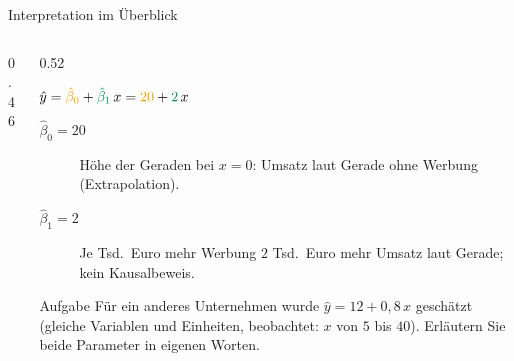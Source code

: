 \documentclass[aspectratio=169,11pt]{beamer}
\newcommand{\uebpunkte}{\addplot[only marks, mark=*, mark size=2.6pt, color=hsbiblue]
  coordinates {(1,21) (2,26) (3,24) (4,30) (5,29)};}
\begin{document}
\begin{frame}{Interpretation im Überblick}
  \begin{columns}[T]
    \begin{column}{0.46\textwidth}
    \end{column}
    \begin{column}{0.52\textwidth}
      \small
      \begin{block}{$\hat{y} = {\color{hsbiaccent}\hat{\beta}_0} + {\color{hsbigreen}\hat{\beta}_1}\,x = {\color{hsbiaccent}20} + {\color{hsbigreen}2}\,x$}
        \begin{description}
          \item[{\color{hsbiaccent}$\hat{\beta}_0 = 20$}] Höhe der Geraden bei $x = 0$:
                Umsatz laut Gerade ohne Werbung (Extrapolation).
          \item[{\color{hsbigreen}$\hat{\beta}_1 = 2$}] Je Tsd.\ Euro mehr Werbung
                $2$ Tsd.\ Euro mehr Umsatz laut Gerade; kein Kausalbeweis.
        \end{description}
      \end{block}
      \begin{exampleblock}{Aufgabe}
        Für ein anderes Unternehmen wurde $\hat{y} = 12 + 0{,}8\,x$ geschätzt
        (gleiche Variablen und Einheiten, beobachtet: $x$ von $5$ bis $40$).
        Erläutern Sie beide Parameter in eigenen Worten.
      \end{exampleblock}
    \end{column}
  \end{columns}
\end{frame}
\end{document}
